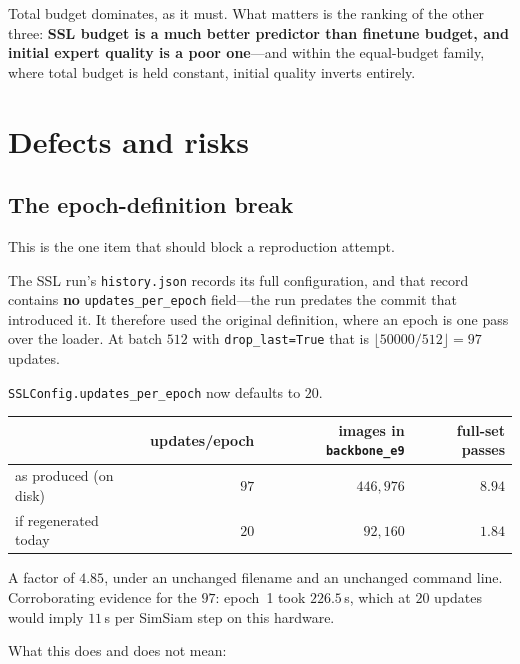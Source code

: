 \documentclass[11pt,a4paper]{article}
\newcommand{\code}[1]{\texttt{\small #1}}
\begin{document}
\noindent Total budget dominates, as it must. What matters is the ranking of
the other three: \textbf{SSL budget is a much better predictor than finetune
budget, and initial expert quality is a poor one}---and within the equal-budget
family, where total budget is held constant, initial quality inverts entirely.

\section{Defects and risks}

\subsection{The epoch-definition break}
\label{sec:break}

This is the one item that should block a reproduction attempt.

The SSL run's \code{history.json} records its full configuration, and that
record contains \textbf{no} \code{updates\_per\_epoch} field---the run predates
the commit that introduced it. It therefore used the original definition, where
an epoch is one pass over the loader. At batch $512$ with
\code{drop\_last=True} that is $\lfloor 50000/512 \rfloor = 97$ updates.

\code{SSLConfig.updates\_per\_epoch} now defaults to $20$.

\begin{center}
\begin{tabular}{@{}lrrr@{}}
\toprule
& \textbf{updates/epoch} & \textbf{images in \code{backbone\_e9}} &
\textbf{full-set passes} \\
\midrule
as produced (on disk) & $97$ & $446{,}976$ & $8.94$ \\
if regenerated today & $20$ & $92{,}160$ & $1.84$ \\
\bottomrule
\end{tabular}
\end{center}

\noindent A factor of $4.85$, under an unchanged filename and an unchanged
command line. Corroborating evidence for the $97$: epoch~1 took $226.5$\,s,
which at $20$ updates would imply $11$\,s per SimSiam step on this hardware.

What this does and does not mean:
\end{document}
